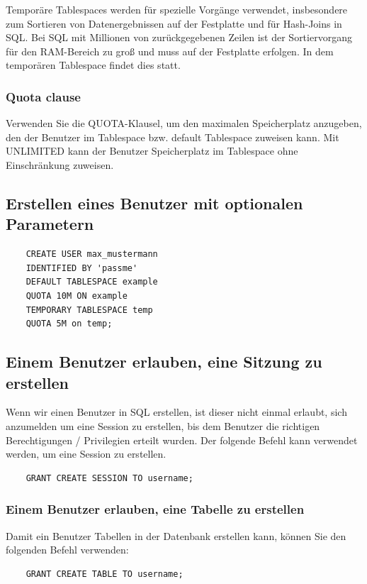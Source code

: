 Temporäre Tablespaces werden für spezielle Vorgänge verwendet, insbesondere zum Sortieren von Datenergebnissen auf der Festplatte und für Hash-Joins in SQL. Bei SQL mit Millionen von zurückgegebenen Zeilen ist der Sortiervorgang für den RAM-Bereich zu groß und muss auf der Festplatte erfolgen. In dem temporären Tablespace findet dies statt.


\subsubsection{Quota clause}
Verwenden Sie die QUOTA-Klausel, um den maximalen Speicherplatz anzugeben, den der Benutzer im Tablespace bzw. default Tablespace zuweisen kann. Mit UNLIMITED kann der Benutzer Speicherplatz im Tablespace ohne Einschränkung zuweisen.

\subsection{Erstellen eines Benutzer mit optionalen Parametern}
\begin{lstlisting}
    CREATE USER max_mustermann
    IDENTIFIED BY 'passme'
    DEFAULT TABLESPACE example
    QUOTA 10M ON example
    TEMPORARY TABLESPACE temp
    QUOTA 5M on temp;
\end{lstlisting}

\subsection{Einem Benutzer erlauben, eine Sitzung zu erstellen}
Wenn wir einen Benutzer in SQL erstellen, ist dieser nicht einmal erlaubt, sich anzumelden um eine Session zu erstellen, bis dem Benutzer die richtigen Berechtigungen / Privilegien erteilt wurden.
Der folgende Befehl kann verwendet werden, um eine Session zu erstellen.

\begin{lstlisting}
    GRANT CREATE SESSION TO username;
\end{lstlisting}

\subsubsection{Einem Benutzer erlauben, eine Tabelle zu erstellen}
Damit ein Benutzer Tabellen in der Datenbank erstellen kann, können Sie den folgenden Befehl verwenden:

\begin{lstlisting}
    GRANT CREATE TABLE TO username;
\end{lstlisting}

